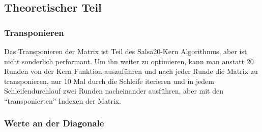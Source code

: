 \documentclass[course=erap]{aspdoc}
\begin{document}
\subsection{Theoretischer Teil}
\subsubsection{Transponieren}
Das Transponieren der Matrix ist Teil des Salsa20-Kern Algorithmus, aber ist nicht sonderlich performant. Um ihn weiter zu optimieren, 
kann man anstatt 20 Runden von der Kern Funktion auszuführen und nach jeder Runde die Matrix zu transponieren, nur 10 Mal durch die Schleife iterieren
und in jedem Schleifendurchlauf zwei Runden nacheinander ausführen, aber mit den ``transponierten'' Indexen der Matrix.   
\subsubsection{Werte an der Diagonale}
\end{document}

